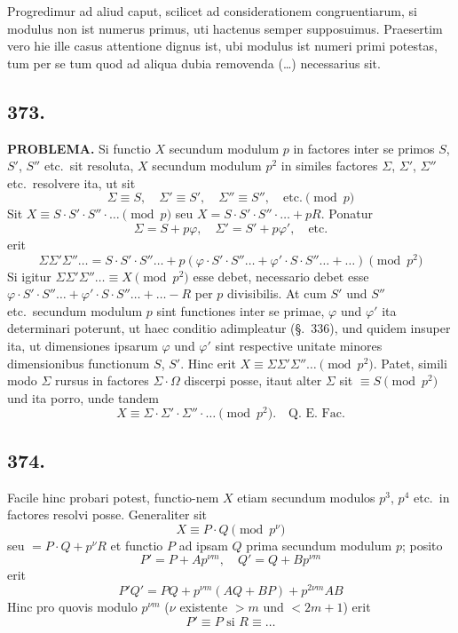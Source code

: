 \documentclass[12pt,a4paper]{article}
\newcommand{\Sec}{\S}
\begin{document}
Progredimur ad aliud caput, scilicet ad considerationem congruentiarum, si modulus non ist numerus primus, uti hactenus semper supposuimus. Praesertim vero hie ille casus attentione dignus ist, ubi modulus ist numeri primi potestas, tum per se tum quod ad aliqua dubia removenda (\ldots) necessarius sit.

\subsection*{373.}

\textbf{PROBLEMA.} Si functio $X$ secundum modulum $p$ in factores inter se primos $S$, $S'$, $S''$ etc.~sit resoluta, $X$ secundum modulum $p^2$ in similes factores $\Sigma$, $\Sigma'$, $\Sigma''$ etc.~resolvere ita, ut sit
\[
\Sigma\equiv S,\quad \Sigma'\equiv S',\quad \Sigma''\equiv S'',\quad \text{etc.}\pmod{p}
\]
Sit $X\equiv S\cdot S'\cdot S''\cdot\ldots\pmod{p}$ seu $X=S\cdot S'\cdot S''\cdot\ldots+pR$. Ponatur
\[
\Sigma = S+p\varphi,\quad \Sigma'=S'+p\varphi',\quad \text{etc.}
\]
erit
\[
\Sigma\Sigma'\Sigma''\ldots = S\cdot S'\cdot S''\ldots + p(\varphi\cdot S'\cdot S''\ldots + \varphi'\cdot S\cdot S''\ldots + \ldots) \pmod{p^2}
\]
Si igitur $\Sigma\Sigma'\Sigma''\ldots\equiv X\pmod{p^2}$ esse debet, necessario debet esse $\varphi\cdot S'\cdot S''\ldots + \varphi'\cdot S\cdot S''\ldots + \ldots - R$ per $p$ divisibilis. At cum $S'$ und $S''$ etc.~secundum modulum $p$ sint functiones inter se primae, $\varphi$ und $\varphi'$ ita determinari poterunt, ut haec conditio adimpleatur (\Sec.~336), und quidem insuper ita, ut dimensiones ipsarum $\varphi$ und $\varphi'$ sint respective unitate minores dimensionibus functionum $S$, $S'$. Hinc erit $X\equiv\Sigma\Sigma'\Sigma''\ldots\pmod{p^2}$. Patet, simili modo $\Sigma$ rursus in factores $\Sigma\cdot\Omega$ discerpi posse, itaut alter $\Sigma$ sit $\equiv S\pmod{p^2}$ und ita porro, unde tandem
\[
X \equiv \Sigma\cdot\Sigma'\cdot\Sigma''\cdot\ldots \pmod{p^2}. \quad \text{Q.~E.~Fac.}
\]

\subsection*{374.}

Facile hinc probari potest, functio-nem $X$ etiam secundum modulos $p^3$, $p^4$ etc.~in factores resolvi posse. Generaliter sit
\[
X\equiv P\cdot Q\pmod{p^\nu}
\]
seu $=P\cdot Q+p^\nu R$ et functio $P$ ad ipsam $Q$ prima secundum modulum $p$; posito
\[
P'=P+Ap^{\nu m},\quad Q'=Q+Bp^{\nu m}
\]
erit
\[
P'Q' = PQ + p^{\nu m}(AQ+BP) + p^{2\nu m}AB
\]
Hinc pro quovis modulo $p^{\nu m}$ ($\nu$ existente $>m$ und $<2m+1$) erit
\[
P'\equiv P \text{ si } R\equiv \ldots
\]
\end{document}
